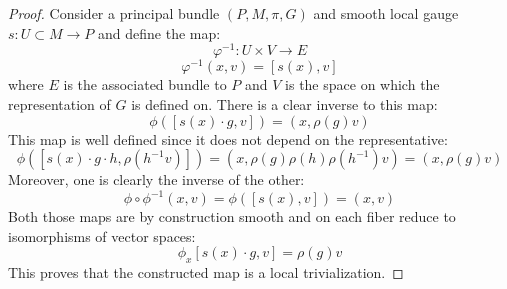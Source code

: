 \documentclass[12pt,a4paper]{report}
\theoremstyle{definition}
\theoremstyle{Theorem}
\theoremstyle{definition}
\theoremstyle{definition}
\begin{document}
	\begin{proof}
		Consider a principal bundle $(P,M,\pi,G)$ and smooth local gauge $s:U\subset M\rightarrow P$ and define the map:
		$$\varphi^{-1}:U\times V\rightarrow E$$
		$$\varphi^{-1}(x,v)=[s(x),v]$$
		where $E$ is the associated bundle to $P$ and $V$ is the space on which the representation of $G$ is defined on.
		There is a clear inverse to this map:
		$$\phi([s(x)\cdot g,v])=(x,\rho(g)v)$$
		This map is well defined since it does not depend on the representative:
		$$\phi([s(x)\cdot g\cdot h,\rho(h^{-1}v)])=(x,\rho(g)\rho(h)\rho(h^{-1})v)=(x,\rho(g)v)$$
		Moreover, one is clearly the inverse of the other:
		$$\phi\circ \phi^{-1}(x,v)=\phi([s(x),v])=(x,v)$$ 
		Both those maps are by construction  smooth and on each fiber reduce to isomorphisms of vector spaces:
		$$\phi_x[s(x)\cdot g,v]=\rho(g)v$$
		This proves that the constructed map is a local trivialization.
	\end{proof}
\end{document}
